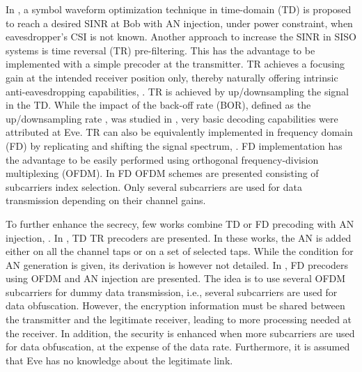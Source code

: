 \documentclass[journal,comsoc]{IEEEtran}
\begin{document}
In \cite{li2013waveform}, a symbol waveform optimization technique in time-domain (TD) is proposed to reach a desired SINR at Bob with AN injection, under power constraint, when eavesdropper’s CSI is not known. Another approach to increase the SINR in SISO systems is time reversal (TR) pre-filtering. This has the advantage to be implemented with a simple precoder at the transmitter. TR achieves a focusing gain at the intended receiver position only, thereby naturally offering intrinsic anti-eavesdropping capabilities, \cite{9003692,oestges2005characterization}. TR is achieved by up/downsampling the signal in the TD. While the impact of the back-off rate (BOR), defined as the up/downsampling rate \cite{dubois2010use}, was studied in \cite{9003692,9049811}, very basic decoding capabilities were attributed at Eve. TR can also be equivalently implemented in frequency domain (FD) by replicating and shifting the signal spectrum, \cite{8883213}. FD implementation has the advantage to be easily performed using orthogonal frequency-division multiplexing (OFDM). In \cite{8093595,8093591} FD OFDM schemes are presented consisting of subcarriers index selection. Only several subcarriers are used for data transmission depending on their channel gains.

To further enhance the secrecy, few works combine TD or FD precoding with AN injection, \cite{xu2018security,li2018artificial,li2017artificial,7475864,7041552}. In \cite{xu2018security,li2018artificial,li2017artificial}, TD TR precoders are presented. In these works, the AN is added either on all the channel taps or on a set of selected taps. While the condition for AN generation is given, its derivation is however not detailed. In \cite{7475864,7041552}, FD precoders using OFDM and AN injection are presented. The idea is to use several OFDM subcarriers for dummy data transmission, i.e., several subcarriers are used for data obfuscation. However, the encryption information must be shared between the transmitter and the legitimate receiver, leading to more processing needed at the receiver. In addition, the security is enhanced when more subcarriers are used for data obfuscation, at the expense of the data rate. Furthermore, it is assumed that Eve has no knowledge about the legitimate link.
\end{document}
